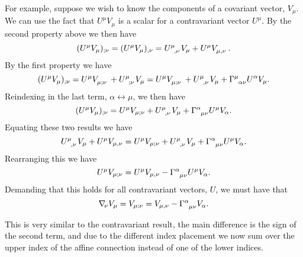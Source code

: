 \documentclass[fleqn]{NotesClass}
\newcommand*{\christoffel}[3]{\tensor{\Gamma}{^{#1}_{{#2}{#3}}}}
\newcommand*{\covariantDerivative}[1]{\nabla_{\!#1}}
\begin{document}
    For example, suppose we wish to know the components of a covariant vector, \(V_\mu\).
    We can use the fact that \(U^\mu V_\mu\) is a scalar for a contravariant vector \(U^\mu\).
    By the second property above we then have
    \begin{equation}
        (U^\mu V_\mu)_{;\nu} = (U^\mu V_\mu)_{,\nu} = \tensor{U}{^\mu_{,\nu}}V_\mu + U^\mu\tensor{V}{_{\mu,\nu}}.
    \end{equation}
    By the first property we have
    \begin{equation}
        (U^\mu V_\mu)_{;\nu} = U^\mu \tensor{V}{_{\mu;\nu}} + \tensor{U}{^\mu_{;\nu}}V_\mu = U^\mu \tensor{V}{_{\mu;\nu}} + \tensor{U}{^\mu_{,\nu}}V_\mu + \christoffel{\mu}{\alpha}{\nu}U^\alpha V_\mu.
    \end{equation}
    Reindexing in the last term, \(\alpha \leftrightarrow \mu\), we then have
    \begin{equation}
        (U^\mu V_\mu)_{;\nu} = U^\mu V_{\mu;\nu} + \tensor{U}{^\mu_{,\nu}} V_\mu + \christoffel{\alpha}{\mu}{\nu} U^\mu V_\alpha.
    \end{equation}
    Equating these two results we have
    \begin{equation}
        \tensor{U}{^\mu_{,\nu}} V_{\mu} + U^\mu V_{\mu,\nu} = U^\mu V_{\mu;\nu} + \tensor{U}{^\mu_{,\nu}} V_\mu + \christoffel{\alpha}{\mu}{\nu} U^\mu V_\alpha.
    \end{equation}
    Rearranging this we have
    \begin{equation}
        U^\mu V_{\mu;\nu} = U^\mu V_{\mu,\nu} - \christoffel{\alpha}{\mu}{\nu} U^\mu V_\alpha.
    \end{equation}
    Demanding that this holds for all contravariant vectors, \(U\), we must have that
    \begin{equation}
        \covariantDerivative{\nu} V_\mu = V_{\mu;\nu} = V_{\mu,\nu} - \christoffel{\alpha}{\mu}{\nu} V_\alpha.
    \end{equation}

    This is very similar to the contravariant result, the main difference is the sign of the second term, and due to the different index placement we now sum over the upper index of the affine connection instead of one of the lower indices.
    
\end{document}
